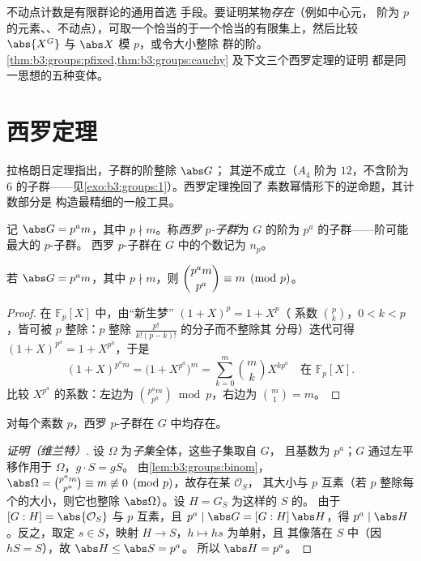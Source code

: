\begin{method}\label{met:b3:groups:counting}
不动点计数是有限群论的通用首选
手段。要证明某物\emph{存在}（例如中心元，
阶为 $p$ 的元素、、不动点），可取一个恰当的于一个恰当的有限集上，然后比较
$\abs{X^G}$ 与 $\abs X$ 模 $p$，或令大小整除
群的阶。
\cref{thm:b3:groups:pfixed,thm:b3:groups:cauchy} 及下文三个西罗定理的证明
都是同一思想的五种变体。
\end{method}

\section{西罗定理}

拉格朗日定理指出，子群的阶整除 $\abs G$；
其逆不成立（$A_4$ 阶为 $12$，不含阶为
$6$ 的子群——见\cref{exo:b3:groups:1}）。西罗定理挽回了
素数幂情形下的逆命题，其计数部分是
构造最精细的一般工具。

\begin{definition}\label{def:b3:groups:sylow}
记 $\abs G = p^a m$，其中 $p \nmid m$。称\emph{西罗
$p$-子群}为 $G$ 的阶为
$p^a$ 的子群——阶可能最大的 $p$-子群。
西罗 $p$-子群在 $G$ 中的个数记为 $n_p$。
\end{definition}

\begin{lemma}\label{lem:b3:groups:binom}
若 $\abs G = p^a m$，其中 $p \nmid m$，则 $\dbinom{p^a m}{p^a}
\equiv m \pmod p$。
\end{lemma}

\begin{proof}
在 $\mathbb F_p[X]$ 中，由“新生梦” $(1+X)^p = 1 + X^p$（
系数 $\binom pk$，$0<k<p$，皆可被 $p$ 整除：$p$
整除 $\frac{p!}{k!(p-k)!}$ 的分子而不整除其
分母）迭代可得 $(1+X)^{p^a} = 1 + X^{p^a}$，于是
\[
(1+X)^{p^a m} = \bigl(1 + X^{p^a}\bigr)^m
= \sum_{k=0}^{m} \binom mk X^{k p^a} \quad\text{在 } \mathbb
F_p[X].
\]
比较 $X^{p^a}$ 的系数：左边为 $\binom{p^a
m}{p^a} \bmod p$，右边为 $\binom m1 = m$。
\end{proof}

\begin{theorem}[西罗 I：存在性]\label{thm:b3:groups:sylow1}
对每个素数 $p$，西罗 $p$-子群在 $G$ 中均存在。
\end{theorem}

\begin{proof}[证明（维兰特）]
设 $\Omega$ 为\emph{子集}全体，这些子集取自 $G$，
且基数为 $p^a$；$G$ 通过左平移作用于 $\Omega$，$g \cdot S = gS$。
由\cref{lem:b3:groups:binom}，$\abs\Omega = \binom{p^a m}{p^a}
\equiv m \not\equiv 0 \pmod p$，故存在某 $\mathcal O_S$，
其大小与 $p$ 互素（若 $p$ 整除每个的大小，则它也整除
$\abs\Omega$）。设 $H = G_S$ 为这样的 $S$ 的。
由于 $[G : H] = \abs{\mathcal O_S}$ 与 $p$ 互素，且 $p^a \mid
\abs G = [G:H]\,\abs H$，得 $p^a \mid \abs H$。反之，取定
$s \in S$，映射 $H \to S$，$h \mapsto hs$ 为单射，且
其像落在 $S$ 中（因 $hS = S$），故 $\abs H \leq \abs S = p^a$。
所以 $\abs H = p^a$。
\end{proof}

